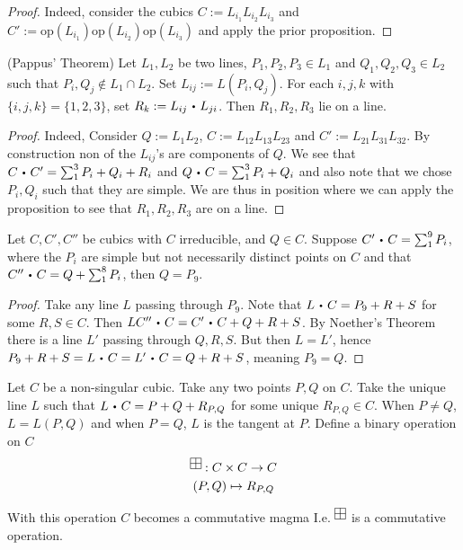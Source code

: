     \begin{proof}
        Indeed, consider the cubics $C:=L_{i_1}L_{i_2}L_{i_3}$ and $C':=\mathrm{op}(L_{i_1})\mathrm{op}(L_{i_2})\mathrm{op}(L_{i_3})$ and apply the prior proposition. 
    \end{proof}
    \begin{corollary}(Pappus' Theorem)
        Let $L_1,L_2$ be two lines, $P_1,P_2,P_3\in L_1$ and $Q_1,Q_2,Q_3\in L_2$ such that $P_i,Q_j\notin L_1\cap L_2$. Set $L_{ij}:= L(P_i,Q_j)$. For each $i,j,k$ with $\{i,j,k\} = \{1,2,3\}$, set $R_k:=L_{ij}\ic L_{ji}$. Then $R_1, R_2,R_3$ lie on a line. 
    \end{corollary}
    \begin{proof}
        Indeed, Consider $Q:= L_1L_2$, $C:=L_{12}L_{13}L_{23}$ and $C':=L_{21}L_{31}L_{32}$. By construction non of the $L_{ij}$'s are components of $Q$. We see that $C\ic C' = \sum_1^3 P_i+Q_i+R_i$ and $Q\ic C = \sum_1^3 P_i+Q_i$ and also note that we chose $P_i,Q_i$ such that they are simple. We are thus in position where we can apply the proposition to see that $R_1,R_2,R_3$ are on a line. 
    \end{proof}
    \begin{proposition}
        Let $C,C',C''$ be cubics with $C$ irreducible, and $Q\in C$. Suppose $C'\ic C=\sum_1^9 P_i$, where the $P_i$ are simple but not necessarily distinct points on $C$ and that $C''\ic C = Q+\sum_1^8 P_i$, then $Q=P_9$. 
    \end{proposition}
    \begin{proof}
         Take any line $L$ passing through $P_9$. Note that $L\ic C= P_9+R+S$ for some $R,S\in C$. Then $LC''\ic C=C'\ic C+Q+R+S$. By Noether's Theorem there is a line $L'$ passing through $Q,R,S$. But then $L=L'$, hence $P_9+R+S = L\ic C=L' \ic C=  Q+R+S$, meaning $P_9=Q$.  
    \end{proof}
    \begin{definition}
        Let $C$ be a non-singular cubic. Take any two points $P,Q$ on $C$. Take the unique line $L$ such that $L\ic C = P+Q+R_{P,Q}$ for some unique $R_{P,Q}\in C$. When $P\neq Q$, $L=L(P,Q)$ and when $P=Q$, $L$ is the tangent at $P$. Define a binary operation on $C$
        \begin{gather*}
            \squareplus: C\times C\rightarrow C\\
            (P,Q)\mapsto R_{P,Q}
        \end{gather*}
    \end{definition}
    \begin{remark}
        With this operation $C$ becomes a commutative magma I.e. $\squareplus$ is a commutative operation.
    \end{remark}
